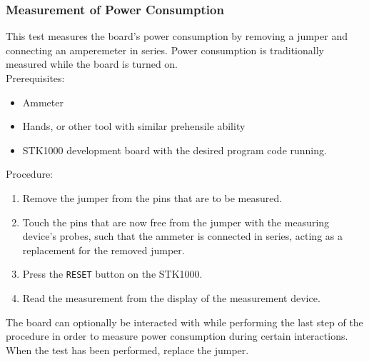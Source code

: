 \subsubsection{Measurement of Power Consumption}
This test measures the board's power consumption by removing a jumper and connecting an amperemeter in series.
Power consumption is traditionally measured while the board is turned on. 
\\
Prerequisites:
\begin{itemize}
	\item{Ammeter}
	\item{Hands, or other tool with similar prehensile ability}
    \item{STK1000 development board with the desired program code running.}
\end{itemize}
Procedure:
\begin{enumerate}
    \item{Remove the jumper from the pins that are to be measured.}
    \item{Touch the pins that are now free from the jumper with the measuring device's probes, such that the ammeter is connected in series, acting as a replacement for the removed jumper.}
	\item{Press the \texttt{RESET} button on the STK1000.}
    \item{Read the measurement from the display of the measurement device.}
\end{enumerate}
The board can optionally be interacted with while performing the last step of the procedure in order to measure power consumption during certain interactions.
When the test has been performed, replace the jumper.

